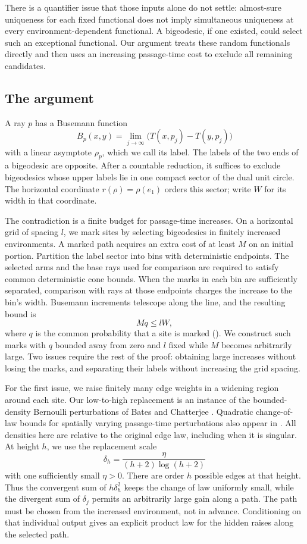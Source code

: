 There is a quantifier issue that those inputs alone do not settle:
almost-sure uniqueness for each fixed functional does not imply
simultaneous uniqueness at every environment-dependent functional.
A bigeodesic, if one existed, could select such an exceptional
functional. Our argument treats these random functionals directly
and then uses an increasing passage-time cost to exclude all
remaining candidates.

\subsection*{The argument}
A ray \(p\) has a Busemann function
\[
 B_p(x,y)=\lim_{j\to\infty}
          \bigl(T(x,p_j)-T(y,p_j)\bigr)
\]
with a linear asymptote \(\rho_p\), which we call its label.
The labels of the two ends of a bigeodesic are opposite.
After a countable reduction, it suffices to exclude bigeodesics whose
upper labels lie in one compact sector of the dual unit circle.
The horizontal coordinate \(r(\rho)=\rho(e_1)\) orders this sector;
write \(W\) for its width in that coordinate.

The contradiction is a finite budget for passage-time increases.
On a horizontal grid of spacing \(l\), we mark sites by selecting
bigeodesics in finitely increased environments. A marked path acquires
an extra cost of at least \(M\) on an initial portion.
Partition the label sector into bins with deterministic endpoints.
The selected arms and the base rays used for comparison are required
to satisfy common deterministic cone bounds.
When the marks in each bin are sufficiently separated, comparison
with rays at those endpoints charges the increase to the bin's width.
Busemann increments telescope along the line, and the resulting bound is
\[
 Mq\le lW,
\]
where \(q\) is the common probability that a site is marked
(). We construct such marks with \(q\) bounded
away from zero and \(l\) fixed while \(M\) becomes arbitrarily large.
Two issues require the rest of the proof: obtaining large increases
without losing the marks, and separating their labels without increasing
the grid spacing.

For the first issue, we raise finitely many edge weights in a widening
region around each site. Our low-to-high replacement is an instance of
the bounded-density Bernoulli perturbations of Bates and Chatterjee
\cite[Lemmas~2.3--2.4]{BatesChatterjee2020}.
Quadratic change-of-law bounds for spatially varying passage-time
perturbations also appear in
\cite[Section~2.3]{DembinElboimPeled}.
All densities here are relative to the original edge law, including
when it is singular. At height \(h\), we use the replacement scale
\[
 \delta_h=\frac{\eta}{(h+2)\log(h+2)}
\]
with one sufficiently small \(\eta>0\).
There are order \(h\) possible edges at that height. Thus the convergent
sum of \(h\delta_h^2\) keeps the change of law uniformly small, while
the divergent sum of \(\delta_j\) permits an arbitrarily large gain
along a path. The path must be chosen from the increased environment,
not in advance. Conditioning on that individual output gives an explicit product
law for the hidden raises along the selected path.

